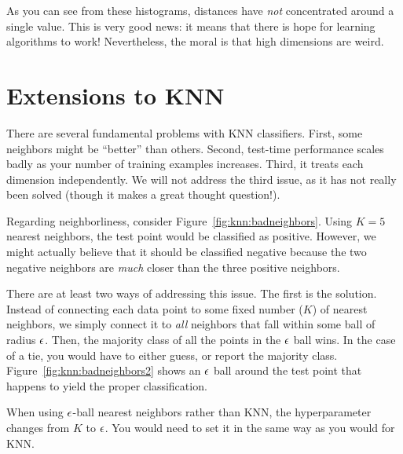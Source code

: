 As you can see from these histograms, distances have \emph{not}
concentrated around a single value.  This is very good news: it means
that there is hope for learning algorithms to work!  Nevertheless, the
moral is that high dimensions are weird.


\section{Extensions to KNN}

There are several fundamental problems with KNN classifiers.  First,
some neighbors might be ``better'' than others.  Second, test-time
performance scales badly as your number of training examples
increases.  Third, it treats each dimension independently.  We will
not address the third issue, as it has not really been solved (though
it makes a great thought question!).


Regarding neighborliness, consider Figure~\ref{fig:knn:badneighbors}.
Using $K=5$ nearest neighbors, the test point would be classified as
positive.  However, we might actually believe that it should be
classified negative because the two negative neighbors are \emph{much}
closer than the three positive neighbors.


There are at least two ways of addressing this issue.  The first is
the  solution.  Instead of connecting each data
point to some fixed number ($K$) of nearest neighbors, we simply
connect it to \emph{all} neighbors that fall within some ball of
radius $\epsilon$.  Then, the majority class of all the points in the $\epsilon$
ball wins.  In the case of a tie, you would have to either guess, or
report the majority class.  Figure~\ref{fig:knn:badneighbors2} shows an
$\epsilon$ ball around the test point that happens to yield the proper
classification.

When using $\epsilon$-ball nearest neighbors rather than KNN, the
hyperparameter changes from $K$ to $\epsilon$.  You would need to set it in
the same way as you would for KNN.


